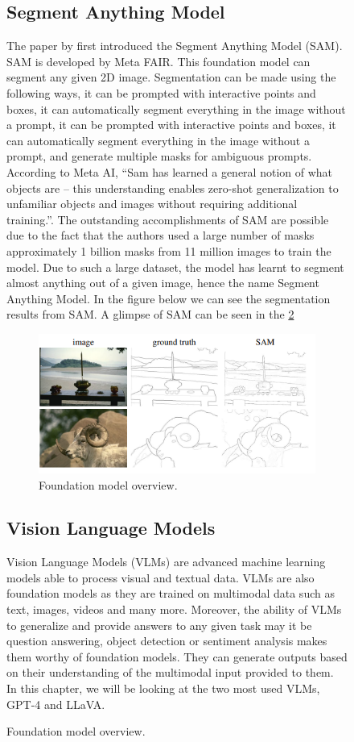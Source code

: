 \begin{figure}[ht!]
\subsection{Segment Anything Model}
The paper by \citet{kirillov2023segment} first introduced the Segment Anything Model (SAM). SAM is developed by Meta FAIR. 
This foundation model can segment any given 2D image. Segmentation can be made using the following ways, 
it can be prompted with interactive points and boxes, it can automatically segment everything in the image without a prompt, 
it can be prompted with interactive points and boxes, it can automatically segment everything in the image without a prompt, 
and generate multiple masks for ambiguous prompts. According to Meta AI, “Sam has learned a general notion of what objects are – this understanding enables zero-shot generalization to 
unfamiliar objects and images without requiring additional training.”. The outstanding accomplishments of SAM are possible due to the fact that
the authors used a large number of masks approximately 1 billion masks from 11 million images to train the model. Due to such a large dataset, 
the model has learnt to segment almost anything out of a given image, hence the name Segment Anything Model. In the figure below we can see the segmentation results from SAM.
A glimpse of SAM can be seen in the \cref{fig:sam}
\begin{figure}[ht!]
    \centering
    \includegraphics[width=\textwidth]{content/images/SAM.png}
    \caption{Foundation model overview. \cite{kirillov2023segment}}
    \label{fig:sam}
\end{figure}
\subsection{Vision Language Models}
Vision Language Models (VLMs) are advanced machine learning models able to process visual and textual data. VLMs are also foundation models as they are trained on multimodal data such as text, images,
videos and many more. Moreover, the ability of VLMs to generalize and provide answers to any given task may it be question answering, object detection or sentiment analysis makes
them worthy of foundation models. They can generate outputs based on their understanding of the multimodal input provided to them. 
In this chapter, we will be looking at the two most used VLMs, GPT-4 and LLaVA.


\end{figure}
